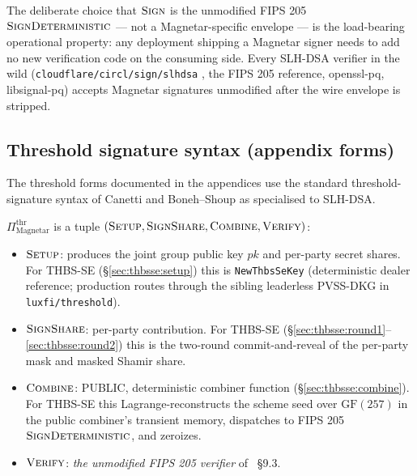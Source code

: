 The deliberate choice that $\textsc{Sign}$ is the unmodified FIPS 205
$\textsc{SignDeterministic}$ --- not a Magnetar-specific envelope ---
is the load-bearing operational property: any deployment shipping a
Magnetar signer needs to add no new verification code on the
consuming side. Every SLH-DSA verifier in the wild
(\texttt{cloudflare/circl/sign/slhdsa} \cite{circl}, the FIPS 205
reference, openssl-pq, libsignal-pq) accepts Magnetar signatures
unmodified after the wire envelope is stripped.

\subsection{Threshold signature syntax (appendix forms)}
\label{sec:prelim:thresh-syntax}

The threshold forms documented in the appendices use the standard
threshold-signature syntax of Canetti \cite{canetti2001uc} and
Boneh--Shoup \cite{boneh-shoup-textbook} as specialised to SLH-DSA.

\begin{definition}
\label{def:thresh-syntax}
$\Pi_{\mathrm{Magnetar}}^{\mathrm{thr}}$ is a tuple
$(\textsc{Setup}, \textsc{SignShare}, \textsc{Combine},
\textsc{Verify})$:
\begin{itemize}[nosep,leftmargin=2em]
  \item $\textsc{Setup}$: produces the joint group public key $pk$
        and per-party secret shares. For THBS-SE
        (\S\ref{sec:thbsse:setup}) this is \texttt{NewThbsSeKey}
        (deterministic dealer reference; production routes
        through the sibling leaderless PVSS-DKG in
        \texttt{luxfi/threshold}).
  \item $\textsc{SignShare}$: per-party contribution. For THBS-SE
        (\S\ref{sec:thbsse:round1}--\ref{sec:thbsse:round2}) this
        is the two-round commit-and-reveal of the per-party mask
        and masked Shamir share.
  \item $\textsc{Combine}$: PUBLIC, deterministic combiner
        function (\S\ref{sec:thbsse:combine}). For THBS-SE this
        Lagrange-reconstructs the scheme seed over
        $\mathrm{GF}(257)$ in the public combiner's transient
        memory, dispatches to FIPS 205
        $\textsc{SignDeterministic}$, and zeroizes.
  \item $\textsc{Verify}$: \emph{the unmodified FIPS 205
        verifier} of \cite{fips205}~\S9.3.
\end{itemize}
\end{definition}

